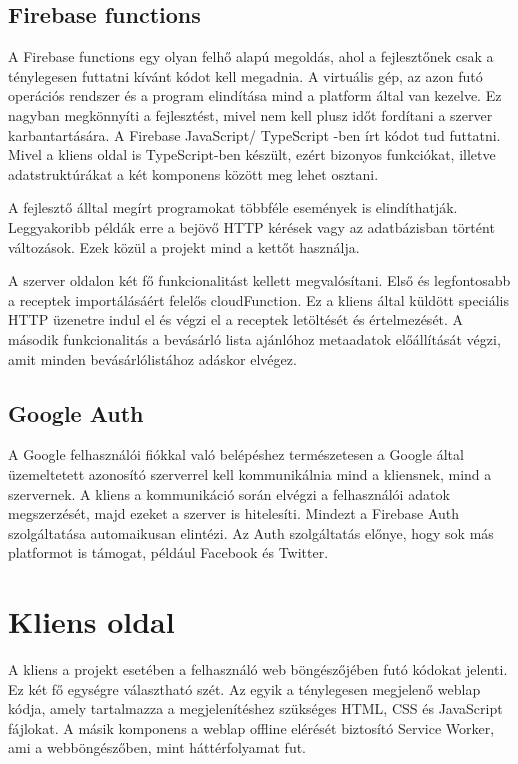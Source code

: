 \documentclass[12pt]{report}
\theoremstyle{definition}
\begin{document}
\subsection{Firebase functions}
A Firebase functions egy olyan felhő alapú megoldás, ahol a fejlesztőnek csak a ténylegesen futtatni kívánt kódot kell megadnia. 
A virtuális gép, az azon futó operációs rendszer és a program elindítása mind a platform által van kezelve. Ez nagyban megkönnyíti a fejlesztést, mivel nem kell plusz időt fordítani a szerver karbantartására. A Firebase JavaScript/ \Gls{TypeScript} -ben írt kódot tud futtatni. Mivel a kliens oldal is \Gls{TypeScript}-ben készült, ezért bizonyos funkciókat, illetve adatstruktúrákat a két komponens között meg lehet osztani. 

A fejlesztő álltal megírt programokat többféle események is elindíthatják. Leggyakoribb példák erre a bejövő HTTP kérések vagy az adatbázisban történt változások. Ezek közül a projekt mind a kettőt használja. 

A szerver oldalon két fő funkcionalitást kellett megvalósítani. Első és legfontosabb a receptek importálásáért felelős \gls{cloudFunction}. Ez a kliens által küldött speciális HTTP üzenetre indul el és végzi el a receptek letöltését és értelmezését. A második funkcionalitás a bevásárló lista ajánlóhoz metaadatok előállítását végzi, amit minden bevásárlólistához adáskor elvégez.

\subsection{Google Auth}
A Google felhasználói fiókkal való belépéshez természetesen a Google által üzemeltetett azonosító szerverrel kell kommunikálnia mind a kliensnek, mind a szervernek. A kliens a kommunikáció során elvégzi a felhasználói adatok megszerzését, majd ezeket a szerver is hitelesíti. Mindezt a Firebase Auth szolgáltatása automaikusan elintézi. Az Auth szolgáltatás előnye, hogy sok más platformot is támogat, például Facebook és Twitter. 

\section{Kliens oldal}
A kliens a projekt esetében a felhasználó web böngészőjében futó kódokat jelenti. Ez két fő egységre választható szét. Az egyik a ténylegesen megjelenő weblap kódja, amely tartalmazza a megjelenítéshez szükséges HTML, CSS és JavaScript fájlokat. A másik komponens a weblap offline elérését biztosító Service Worker, ami a webböngészőben, mint háttérfolyamat fut.
\end{document}
